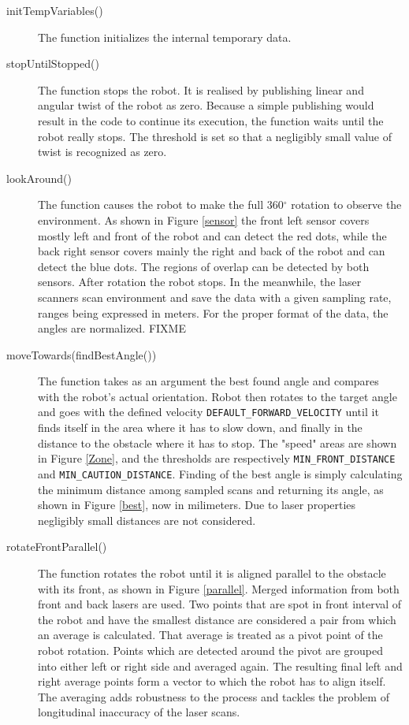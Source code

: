 \begin{description}
\item[initTempVariables()] The function initializes the internal temporary data. 
\item[stopUntilStopped()] The function stops the robot. It is realised by publishing linear and angular twist of the robot as zero. Because a simple publishing would result in the code to continue its execution, the function waits until the robot really stops. The threshold is set so that a negligibly small value of twist is recognized as zero.
\item[lookAround()] The function causes the robot to make the full 360$^{\circ}$ rotation to observe the environment. As shown in Figure \ref{sensor} the front left sensor covers mostly left and front of the robot and can detect the red dots, while the back right sensor covers mainly the right and back of the robot and can detect the blue dots. The regions of overlap can be detected by both sensors. After rotation the robot stops. In the meanwhile, the laser scanners scan environment and save the data with a given sampling rate, ranges being expressed in meters. For the proper format of the data, the angles are normalized. FIXME
\item[moveTowards(findBestAngle())] The function takes as an argument the best found angle and compares with the robot's actual orientation. Robot then rotates to the target angle and goes with the defined velocity \texttt{DEFAULT\_FORWARD\_VELOCITY}
 until it finds itself in the area where it has to slow down, and finally in the distance to the obstacle where it has to stop. The "speed" areas are shown in Figure \ref{Zone}, and the thresholds are respectively \texttt{MIN\_FRONT\_DISTANCE} and \texttt{MIN\_CAUTION\_DISTANCE}. 
 Finding of the best angle is simply calculating the minimum distance among sampled scans and returning its angle, as shown in Figure \ref{best}, now in milimeters. Due to laser properties negligibly small distances are not considered.
\item[rotateFrontParallel()] The function rotates the robot until it is aligned parallel to the obstacle with its front, as shown in Figure \ref{parallel}. Merged information from both front and back lasers are used. Two points that are spot in front interval of the robot and have the smallest distance are considered a pair from which an average is calculated. That average is treated as a pivot point of the robot rotation. Points which are detected around the pivot are grouped into either left or right side and averaged again. The resulting final left and right average points form a vector to which the robot has to align itself. The averaging adds robustness to the process and tackles the problem of longitudinal inaccuracy of the laser scans.

\end{description}
